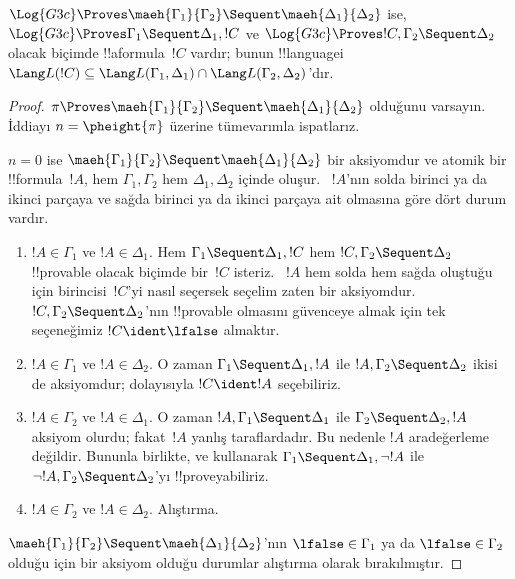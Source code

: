 \documentclass[../../../include/open-logic-section]{subfiles}
\begin{document}
\begin{lem} $\Log{G3c}
\Proves \maeh{\Gamma_1}{\Gamma_2} \Sequent \maeh{\Delta_1}{\Delta_2}$
ise, $\Log{G3c} \Proves \Gamma_1 \Sequent \Delta_1, !C$ ve $\Log{G3c}
\Proves !C, \Gamma_2 \Sequent \Delta_2$ olacak biçimde !!a{formula}~$!C$
vardır; bunun !!{language}{}i $\Lang L(!C) \subseteq \Lang L(\Gamma_1,
\Delta_1) \cap \Lang L(\Gamma_2, \Delta_2)$'dır.
\end{lem}

\begin{proof}
  $\pi \Proves \maeh{\Gamma_1}{\Gamma_2} \Sequent
  \maeh{\Delta_1}{\Delta_2}$ olduğunu varsayın. İddiayı
  $n=\pheight{\pi}$ üzerine tümevarımla ispatlarız.

  $n=0$ ise $\maeh{\Gamma_1}{\Gamma_2} \Sequent
  \maeh{\Delta_1}{\Delta_2}$ bir aksiyomdur ve atomik bir
  !!{formula}~$!A$, hem $\Gamma_1, \Gamma_2$ hem $\Delta_1, \Delta_2$ içinde
  oluşur. ~$!A$'nın solda birinci ya da ikinci parçaya ve sağda birinci ya
  da ikinci parçaya ait olmasına göre dört durum vardır.
  \begin{enumerate}
    \item $!A \in \Gamma_1$ ve $!A \in \Delta_1$. Hem $\Gamma_1 \Sequent
    \Delta_1, !C$ hem $!C, \Gamma_2 \Sequent \Delta_2$ !!{provable} olacak
    biçimde bir~$!C$ isteriz. ~$!A$ hem solda hem sağda oluştuğu için
    birincisi~$!C$'yi nasıl seçersek seçelim zaten bir aksiyomdur. $!C,
    \Gamma_2 \Sequent \Delta_2$'nın !!{provable} olmasını güvenceye almak
    için tek seçeneğimiz $!C \ident \lfalse$ almaktır.
    \item $!A \in \Gamma_1$ ve $!A \in \Delta_2$. O zaman $\Gamma_1
    \Sequent \Delta_1, !A$ ile $!A, \Gamma_2 \Sequent \Delta_2$ ikisi de
    aksiyomdur; dolayısıyla $!C \ident !A$ seçebiliriz.
    \item $!A \in \Gamma_2$ ve $!A \in \Delta_1$. O zaman $!A, \Gamma_1
    \Sequent \Delta_1$ ile $\Gamma_2 \Sequent \Delta_2, !A$ aksiyom
    olurdu; fakat~$!A$ yanlış taraflardadır. Bu nedenle $!A$ aradeğerleme
    değildir. Bununla birlikte, \RightR{\lnot} ve \LeftR{\lnot} kullanarak
    $\Gamma_1 \Sequent \Delta_1, \lnot!A$ ile $\lnot !A, \Gamma_2 \Sequent
    \Delta_2$'yı !!{prove}{}yabiliriz.
    \item $!A \in \Gamma_2$ ve $!A \in \Delta_2$. Alıştırma.
  \end{enumerate}
  $\maeh{\Gamma_1}{\Gamma_2} \Sequent \maeh{\Delta_1}{\Delta_2}$'nın
  $\lfalse \in \Gamma_1$ ya da $\lfalse \in \Gamma_2$ olduğu için bir
  aksiyom olduğu durumlar alıştırma olarak bırakılmıştır.


\end{proof}
\end{document}
